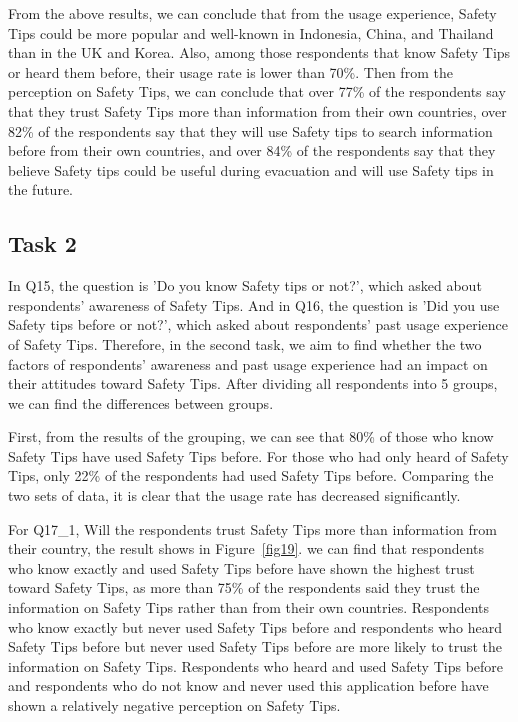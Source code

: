 From the above results, we can conclude that from the usage experience, Safety Tips could be more popular and well-known in Indonesia, China, and Thailand than in the UK and Korea. Also, among those respondents that know Safety Tips or heard them before, their usage rate is lower than 70\%. Then from the perception on Safety Tips, we can conclude that over 77\% of the respondents say that they trust Safety Tips more than information from their own countries, over 82\% of the respondents say that they will use Safety tips to search information before from their own countries, and over 84\% of the respondents say that they believe Safety tips could be useful during evacuation and will use Safety tips in the future.

\cleardoublepage
\subsection{Task 2}
In Q15, the question is 'Do you know Safety tips or not?', which asked about respondents' awareness of Safety Tips. And in Q16, the question is 'Did you use Safety tips before or not?', which asked about respondents' past usage experience of Safety Tips. Therefore, in the second task, we aim to find whether the two factors of respondents' awareness and past usage experience had an impact on their attitudes toward Safety Tips. After dividing all respondents into 5 groups, we can find the differences between groups. 

First, from the results of the grouping, we can see that 80\% of those who know Safety Tips have used Safety Tips before. For those who had only heard of Safety Tips, only 22\% of the respondents had used Safety Tips before. Comparing the two sets of data, it is clear that the usage rate has decreased significantly.

For Q17\_1, Will the respondents trust Safety Tips more than information from their country, the result shows in Figure~\ref{fig19}. we can find that respondents who know exactly and used Safety Tips before have shown the highest trust toward Safety Tips, as more than 75\% of the respondents said they trust the information on Safety Tips rather than from their own countries. Respondents who know exactly but never used Safety Tips before and respondents who heard Safety Tips before but never used Safety Tips before are more likely to trust the information on Safety Tips. Respondents who heard and used Safety Tips before and respondents who do not know and never used this application before have shown a relatively negative perception on Safety Tips. 

